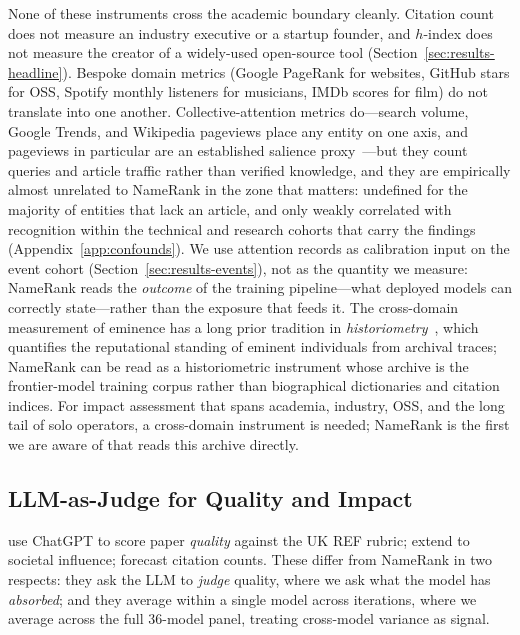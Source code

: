 \documentclass[11pt]{article}
\begin{document}
None of these instruments cross the academic boundary cleanly. Citation count does not measure an industry executive or a startup founder, and $h$-index does not measure the creator of a widely-used open-source tool (Section~\ref{sec:results-headline}). Bespoke domain metrics (Google PageRank for websites, GitHub stars for OSS, Spotify monthly listeners for musicians, IMDb scores for film) do not translate into one another. Collective-attention metrics do---search volume, Google Trends, and Wikipedia pageviews place any entity on one axis, and pageviews in particular are an established salience proxy~\citep{mestyan2013early,ripberger2011capturing}---but they count queries and article traffic rather than verified knowledge, and they are empirically almost unrelated to NameRank in the zone that matters: undefined for the majority of entities that lack an article, and only weakly correlated with recognition within the technical and research cohorts that carry the findings (Appendix~\ref{app:confounds}). We use attention records as calibration input on the event cohort (Section~\ref{sec:results-events}), not as the quantity we measure: NameRank reads the \emph{outcome} of the training pipeline---what deployed models can correctly state---rather than the exposure that feeds it. The cross-domain measurement of eminence has a long prior tradition in \emph{historiometry}~\citep{simonton1999}, which quantifies the reputational standing of eminent individuals from archival traces; NameRank can be read as a historiometric instrument whose archive is the frontier-model training corpus rather than biographical dictionaries and citation indices. For impact assessment that spans academia, industry, OSS, and the long tail of solo operators, a cross-domain instrument is needed; NameRank is the first we are aware of that reads this archive directly.

\subsection{LLM-as-Judge for Quality and Impact}

\citet{thelwall2024chatgpt, thelwall2025plos, thelwall2025multistage} use ChatGPT to score paper \emph{quality} against the UK REF rubric; \citet{kousha2025jasist} extend to societal influence; \citet{liu2026llmprediction} forecast citation counts. These differ from NameRank in two respects: they ask the LLM to \emph{judge} quality, where we ask what the model has \emph{absorbed}; and they average within a single model across iterations, where we average across the full $36$-model panel, treating cross-model variance as signal.
\end{document}
